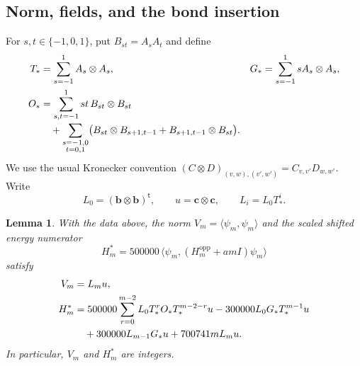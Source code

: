 \documentclass[11pt]{article}
\newtheorem{lemma}[theorem]{Lemma}
\theoremstyle{remark}
\numberwithin{equation}{section}
\begin{document}
\subsection{Norm, fields, and the bond insertion}

For $s,t\in\{-1,0,1\}$, put $B_{st}=A_sA_t$ and define
\begin{align}
 T_*&=\sum_{s=-1}^{1}A_s\otimes A_s,
 &G_*&=\sum_{s=-1}^{1}sA_s\otimes A_s,
 \label{apptr:one-site-transfers}\\
 O_*&=\sum_{s,t=-1}^{1}st\,B_{st}\otimes B_{st}
 \notag\\[-2pt]
 &\quad+
 \sum_{\substack{s=-1,0\\t=0,1}}
 \bigl(B_{st}\otimes B_{s+1,t-1}
       +B_{s+1,t-1}\otimes B_{st}\bigr).
 \label{apptr:bond-insertion}
\end{align}
We use the usual Kronecker convention
$(C\otimes D)_{(v,w),(v',w')}=C_{v,v'}D_{w,w'}$.
Write
\begin{equation}\label{apptr:boundary-tensors}
 L_0=(\mathbf b\otimes\mathbf b)^{\mathsf t},
 \qquad u=\mathbf c\otimes\mathbf c,
 \qquad L_i=L_0T_*^i.
\end{equation}

\begin{lemma}\label{apptr:contractions}
With the data above, the norm $V_m=\langle\psi_m,\psi_m\rangle$
and the scaled shifted energy numerator
\[
 H_m^*=500000\,
 \langle\psi_m,(H_m^{\mathrm{opp}}+am I)\psi_m\rangle
\]
satisfy
\begin{align}
 V_m&=L_mu,\label{apptr:norm}\\
 H_m^*&=500000\sum_{r=0}^{m-2}
          L_0T_*^rO_*T_*^{m-2-r}u
       -300000L_0G_*T_*^{m-1}u\notag\\
 &\quad+300000L_{m-1}G_*u+700741mL_mu.
 \label{apptr:energy-expanded}
\end{align}
In particular, $V_m$ and $H_m^*$ are integers.
\end{lemma}
\end{document}
